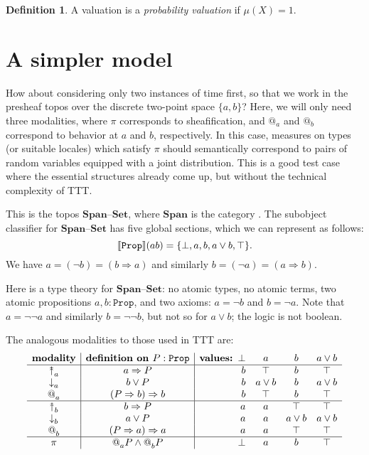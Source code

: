 \documentclass[11pt, oneside, article]{memoir}
\makeatletter
\theoremstyle{plain}
\theoremstyle{definition}
\newtheorem{definition}[theorem]{Definition}
\theoremstyle{remark}
\DeclarePairedDelimiter{\church}{\llbracket}{\rrbracket}
\newcommand{\const}[1]{\mathtt{#1}}
\newcommand{\Cat}[1]{\mathbf{#1}}
\newcommand{\smset}{\Cat{Set}}
\newcommand{\from}{\leftarrow}
\newcommand{\Prop}{\const{Prop}}
\newcommand{\AtSymbol}{{@}}
\newcommand{\SeeSymbol}{{\down}}  %
\newcommand{\InSymbol}{{\upclose}}%
\newcommand{\At}[2][]{\AtSymbol^{#1}_{#2}}
\newcommand{\See}[2][]{\SeeSymbol^{#1}_{#2}}
\newcommand{\In}[2][]{\InSymbol^{#1}_{#2}}
\newcommand{\upclose}{{\rotatebox[origin=c]{90}{$\twoheadrightarrow$}}}
\newcommand{\down}{\mathord{\downarrow}}
\newcommand{\imp}{\Rightarrow}
\newcommand{\Span}{\Cat{Span}}
\newcommand{\set}{\text{--}\smset}
\makeatother
\begin{document}
\begin{definition}
A valuation is a \emph{probability valuation} if $\mu(X) = 1$.
\end{definition}

\section{A simpler model}

How about considering only two instances of time first, so that we work in the presheaf topos over the discrete two-point space $\{a,b\}$? Here, we will only need three modalities, where $\pi$ corresponds to sheafification, and $\At{a}{}$ and $\At{b}{}$ correspond to behavior at $a$ and $b$, respectively. In this case, measures on types (or suitable locales) which satisfy $\pi$ should semantically correspond to pairs of random variables equipped with a joint distribution. This is a good test case where the essential structures already come up, but without the technical complexity of TTT.

This is the topos $\Span\set$, where $\Span$ is the category \fbox{$a\from ab\to b$}. The subobject classifier for $\Span\set$ has five global sections, which we can represent as follows:
\[\church{\Prop}(ab)=\{\bot,a,b,a\vee b,\top\}.\]
We have $a=(\neg b)=(b\imp a)$ and similarly $b=(\neg a)=(a\imp b)$.

Here is a type theory for $\Span\set$: no atomic types, no atomic terms, two atomic propositions $a,b:\Prop$, and two axioms: $a=\neg b$ and $b=\neg a$. Note that $a=\neg\neg a$ and similarly $b=\neg\neg b$, but not so for $a\vee b$; the logic is not boolean.

The analogous modalities to those used in TTT are:
\[
\begin{array}{c|c|rccc}
	\textbf{modality}&\textbf{definition on } P:\Prop&\textbf{values: }\bot&a&b&a\vee b \\\hline
	\In{a}&a\imp P&b&\top&b&\top\\
	\See{a}&b\vee P&b&a\vee b&b&a\vee b\\
	\At{a}&(P\imp b)\imp b&b&\top&b&\top\\\hline
	\In{b}&b\imp P&a&a&\top&\top\\
	\See{b}&a\vee P&a&a&a\vee b&a\vee b\\
	\At{b}&(P\imp a)\imp a&a&a&\top&\top\\\hline
	\pi&\At{a}P\wedge\At{b}P&\bot&a&b&\top
\end{array}
\]

\end{document}
